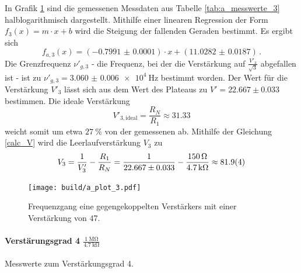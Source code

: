 In Grafik \ref{fig:a_plot_3} sind die gemessenen Messdaten aus Tabelle \ref{tab:a_messwerte_3} halblogarithmisch dargestellt.
Mithilfe einer linearen Regression der Form $f_3(x)= m \cdot x + b$ wird die Steigung der fallenden Geraden bestimmt.
Es ergibt sich
\begin{equation*}
    f_{a,3}(x) = (\num{-0.7991(1)}) \cdot x + (\num{11.0282(187)})\,.
\end{equation*}
Die Grenzfrequenz $\nu'_{g,3}$ - die Frequenz, bei der die Verstärkung auf $\frac{V'_3}{\sqrt{3}}$ abgefallen ist - ist zu $\nu'_{g,3} = \SI{3.060(6)e4}{\hertz}$ bestimmt worden.
Der Wert für die Verstärkung $V'_3$ lässt sich aus dem Wert des Plateaus zu $V'=22.667\pm0.033$ bestimmen.
Die ideale Verstärkung 
\begin{equation*}
    V'_{3,\text{ideal}} = \frac{R_N}{R_1} \approx 31.33
\end{equation*}
weicht somit um etwa $\SI{27}{\percent}$ von der gemessenen ab.
Mithilfe der Gleichung \eqref{calc_V} wird die Leerlaufverstärkung $V_3$ zu
\begin{equation*}
    V_3 = \frac{1}{V'_3} - \frac{R_1}{R_N} = \frac{1}{22.667\pm0.033} - \frac{\SI{150}{\ohm}}{\SI{4.7}{\kilo\ohm}} \approx \num{81.9\pm0.4}
\end{equation*}

\begin{figure}[h!]
    \centering
    \texttt{[image: build/a\_plot\_3.pdf]}
    \caption{Frequenzgang eine gegengekoppelten Verstärkers mit einer Verstärkung von $47$.}
    \label{fig:a_plot_3}
\end{figure}

\paragraph{Verstärungsgrad 4 $\frac{\SI{1}{\mega\ohm}}{\SI{4.7}{\kilo\ohm}}$}

\begin{table}
\centering
\caption{Messwerte zum Verstärkungsgrad 4.}
    \label{tab:a_messwerte_4}
    
\end{table}

